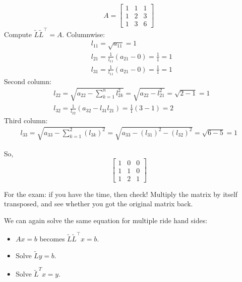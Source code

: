 \begin{example}
    \[ 
        A = \begin{bmatrix}
            1 & 1 & 1\\
            1 & 2 & 3\\
            1 & 3 & 6
        \end{bmatrix}
    \]
    Compute $\tilde{L} \tilde{L}^\intercal = A$.
    Columnwise:
    \begin{align*}
        &
        l_{11} = \sqrt{a_{11}} = 1
        \\&
        l_{21} = \frac{1}{l_{11}} (a_{21} - 0) = \frac{1}{1} = 1
        \\&
        l_{31} = \frac{1}{l_{11}} (a_{21} - 0) = \frac{1}{1} = 1
    \end{align*}
    Second column:
    \begin{align*}
        &
        l_{22} = \sqrt{a_{22} - \sum_{k=1}^n l_{2k}^2} =
        \sqrt{a_{22} - l^2_{21}} = \sqrt{2 - 1} = 1
        \\&
        l_{32} = \frac{1}{l_{22}}(a_{32} - l_{31} l_{21}) = \frac{1}{1} (3 - 1) = 2
    \end{align*}
    Third column:
    \begin{align*}
        l_{33} = \sqrt{a_{33} - \sum_{k=1}^2 (l_{3k})^2} = 
        \sqrt{a_{33} - (l_{31})^2 - (l_{32})^2} = 
        \sqrt{6 - 5} = 1
    \end{align*}

    So,
    \[ 
        \begin{bmatrix}
            1 & 0 & 0\\
            1 & 1 & 0\\
            1 & 2 & 1
        \end{bmatrix}
    \]
\end{example}
\begin{remark}
    For the exam: if you have the time, then check! Multiply the matrix by itself
    transposed, and see whether you got the original matrix back.
\end{remark}

We can again solve the same equation for multiple ride hand sides:
\begin{itemize}
    \item {
        $Ax = b$ becomes $\tilde{L} \tilde{L}^\intercal x = b$.
    }
    \item {
        Solve $\tilde{L} y = b$.
    }
    \item {
        Solve $\tilde{L}^T x = y$.
    }
\end{itemize}

